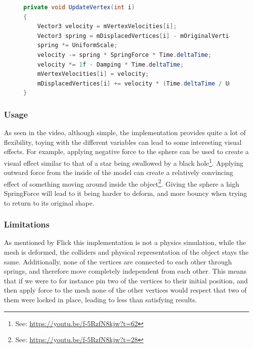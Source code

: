 \begin{figure}
\begin{lstlisting}[label={code:catlike_mesh_deformation_update},language=csharp,caption={Catlike coding mesh deformation vertex update}]
private void UpdateVertex(int i)
{
    Vector3 velocity = mVertexVelocities[i];
    Vector3 spring = mDisplacedVertices[i] - mOriginalVertices[i];
    spring *= UniformScale;
    velocity -= spring * SpringForce * Time.deltaTime;
    velocity *= 1f - Damping * Time.deltaTime;
    mVertexVelocities[i] = velocity;
    mDisplacedVertices[i] += velocity * (Time.deltaTime / UniformScale);
}
\end{lstlisting}
\end{figure}

\subsubsection{Usage}
As seen in the video, although simple, the implementation provides quite a lot of flexibility, toying with the different variables
can lead to some interesting visual effects.
For example, applying negative force to the sphere can be used to create a visual effect similar to that of a star being swallowed by a black hole\footnote{See: \url{https://youtu.be/f-5RzfN8kjw?t=62}}.
Applying outward force from the inside of the model can create a relatively convincing effect of something moving around inside the object\footnote{See: \url{https://youtu.be/f-5RzfN8kjw?t=28}}.
Giving the sphere a high SpringForce will lead to it being harder to deform, and more bouncy when trying to return to its original shape.

\subsubsection{Limitations}
As mentioned by Flick\cite{catlike_mesh_deformation} this implementation is not a physics simulation, while the mesh is deformed,
the colliders and physical representation of the object stays the same.
Additionally, none of the vertices are connected to each other through springs, and therefore move completely independent from each other.
This means that if we were to for instance pin two of the vertices to their initial position, and then apply force to the mesh
none of the other vertices would respect that two of them were locked in place, leading to less than satisfying results.

